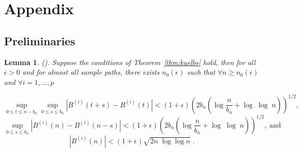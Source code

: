 \documentclass[11pt]{article}
\newtheorem{lemma}{Lemma}
\theoremstyle{remark}
\begin{document}

\section{Appendix}  \label{sec:appendix}
\subsection{Preliminaries} \label{apdx:preliminaries}

\begin{lemma}
\label{lemma: brownian}
(\cite{csorgo1981strong}). Suppose the conditions of Theorem~\ref{thm:kuelbs} hold, then for all $\epsilon > 0$ and for almost all sample paths, there exists $n_{0}\left(\epsilon\right)$ such that $\forall n\geq n_{0}(\epsilon)$ and $\forall i = 1, ..., p$

\[
\sup_{0\leq t \leq n-b_n}\sup_{0 \leq s \leq b_n} \left| B^{\left(i\right)}\left(t+s\right) - B^{\left(i\right)}\left(t\right) \right| < \left(1+ \epsilon\right)\left(2b_n\left(\log\dfrac{n}{b_n} + \log\; \log\; n\right)\right)^{1/2} ,
\]
%
\[
\sup_{0 \leq s \leq b_n} \left|B^{\left(i\right)}\left(n\right) - B^{\left(i\right)}\left(n - s\right)\right| < \left(1+ \epsilon\right)\left(2b_n\left(\log\dfrac{n}{b_n} + \log\;\log\;n\right)\right)^{1/2} , \; \textrm{and}
\]
%
\[
\left|B^{\left(i\right)}\left(n\right)\right| < \left(1+\epsilon\right)\sqrt{2n\;\log \log n} \; . 
\]
\end{lemma}


\end{document}
